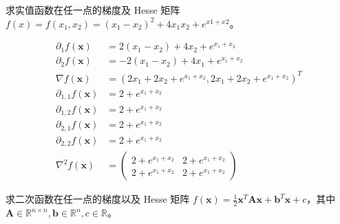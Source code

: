 

\newcommand\Title{最优化方法第2次作业}




\begin{problem}
    求实值函数在任一点的梯度及 Hesse 矩阵 $f(x)=f(x_1, x_2)=(x_1-x_2)^2+4x_1x_2+e^{x1+x2}$。
\end{problem}

\begin{solution}
    $$\begin{aligned}
        \partial_1f(\boldsymbol{x}) &= 2(x_1-x_2)+4x_2+e^{x_1+x_2}\\
        \partial_2f(\boldsymbol{x}) &= -2(x_1-x_2)+4x_1+e^{x_1+x_2}\\
        \nabla f(\boldsymbol{x}) &= (2x_1+2x_2+e^{x_1+x_2},2x_1+2x_2+e^{x_1+x_2})^T\\
        \partial_{1,1}f(\boldsymbol{x}) &= 2+e^{x_1+x_2}\\
        \partial_{1,2}f(\boldsymbol{x}) &= 2+e^{x_1+x_2}\\
        \partial_{2,1}f(\boldsymbol{x}) &= 2+e^{x_1+x_2}\\
        \partial_{2,2}f(\boldsymbol{x}) &= 2+e^{x_1+x_2}\\
        \nabla^2f(\boldsymbol{x})&=\begin{pmatrix}
            2+e^{x_1+x_2} & 2+e^{x_1+x_2} \\
            2+e^{x_1+x_2} & 2+e^{x_1+x_2}
        \end{pmatrix}
    \end{aligned}$$
\end{solution}
  
\begin{problem}
    求二次函数在任一点的梯度以及 Hesse 矩阵 $f(\boldsymbol{x})=\frac{1}{2}\boldsymbol{x}^T\boldsymbol{A}\boldsymbol{x}+\boldsymbol{b}^T\boldsymbol{x}+c$，其中 $\boldsymbol{A}\in\mathbb{R}^{n\times n},\boldsymbol{b}\in \mathbb{R}^{n}, c\in \mathbb{R}$。
\end{problem}

